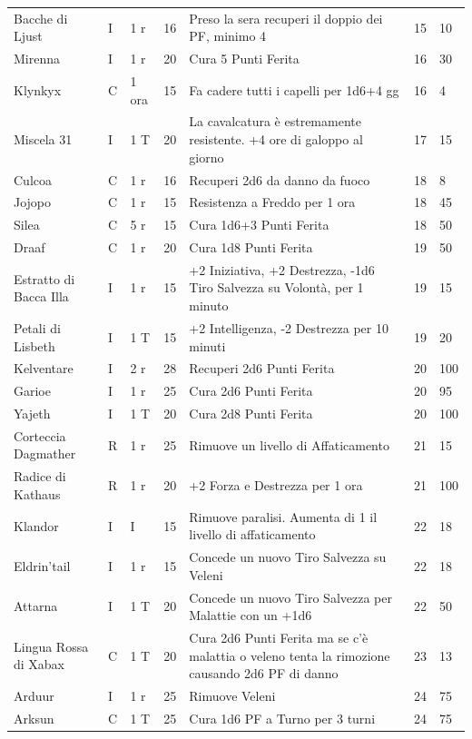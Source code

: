 \begin{xltabular}{\linewidth}{llllXll}
	Bacche di Ljust & I& 1 r & 16& Preso la sera recuperi il doppio dei PF, minimo 4 & 15 & 10 \\
 Mirenna & I& 1 r & 20& Cura 5 Punti Ferita& 16 & 30 \\
	Klynkyx & C& 1 ora & 15& Fa cadere tutti i capelli per 1d6+4 gg & 16 & 4\\
 Miscela 31 & I& 1 T & 20&La cavalcatura è estremamente resistente. +4 ore di galoppo al giorno & 17 & 15\\
	Culcoa & C& 1 r & 16& Recuperi 2d6 da danno da fuoco & 18 & 8 \\
 Jojopo & C& 1 r & 15& Resistenza a Freddo per 1 ora & 18 & 45 \\
	Silea & C& 5 r& 15& Cura 1d6+3 Punti Ferita & 18 & 50 \\
 Draaf & C& 1 r & 20& Cura 1d8 Punti Ferita& 19 & 50 \\
	Estratto di Bacca Illa & I& 1 r & 15& +2 Iniziativa, +2 Destrezza, -1d6 Tiro Salvezza su Volontà, per 1 minuto& 19 & 15\\
 Petali di Lisbeth & I& 1 T & 15&+2 Intelligenza, -2 Destrezza per 10 minuti & 19 & 20 \\
	Kelventare & I& 2 r & 28& Recuperi 2d6 Punti Ferita & 20 & 100 \\
 Garioe & I& 1 r & 25& Cura 2d6 Punti Ferita& 20 & 95 \\
	Yajeth & I& 1 T& 20& Cura 2d8 Punti Ferita& 20 & 100 \\
 Corteccia Dagmather & R& 1 r & 25& Rimuove un livello di Affaticamento& 21 & 15 \\
	Radice di Kathaus & R& 1 r& 20& +2 Forza e Destrezza per 1 ora & 21 & 100 \\
 Klandor & I& I& 15& Rimuove paralisi. Aumenta di 1 il livello di affaticamento& 22 & 18 \\
	Eldrin'tail & I& 1 r& 15& Concede un nuovo Tiro Salvezza su Veleni& 22 & 18 \\
 Attarna & I& 1 T & 20& Concede un nuovo Tiro Salvezza per Malattie con un +1d6& 22 & 50 \\
	Lingua Rossa di Xabax & C& 1 T & 20& Cura 2d6 Punti Ferita ma se c'è malattia o veleno tenta la rimozione causando 2d6 PF di danno & 23 & 13 \\
 Arduur & I& 1 r & 25& Rimuove Veleni& 24 & 75 \\
	Arksun & C& 1 T& 25& Cura 1d6 PF a Turno per 3 turni& 24 & 75 \\

\end{xltabular}
